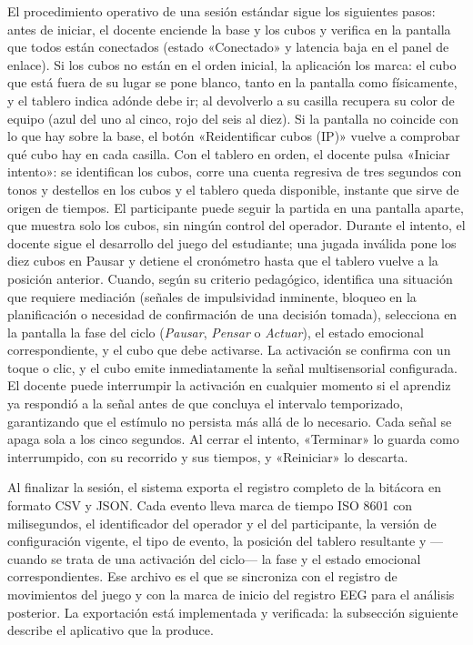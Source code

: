 \documentclass{book}
\begin{document}
El procedimiento operativo de una sesión estándar sigue los siguientes
pasos: antes de iniciar, el docente enciende la base y los cubos y
verifica en la pantalla que todos están conectados (estado «Conectado» y
latencia baja en el panel de enlace). Si los cubos no están en el orden
inicial, la aplicación los marca: el cubo que está fuera de su lugar se
pone blanco, tanto en la pantalla como físicamente, y el tablero indica
adónde debe ir; al devolverlo a su casilla recupera su color de equipo
(azul del uno al cinco, rojo del seis al diez). Si la pantalla no coincide
con lo que hay sobre la base, el botón «Reidentificar cubos (IP)» vuelve a
comprobar qué cubo hay en cada casilla. Con el tablero en orden, el
docente pulsa «Iniciar intento»: se identifican los cubos, corre una
cuenta regresiva de tres segundos con tonos y destellos en los cubos y el
tablero queda disponible, instante que sirve de origen de tiempos. El
participante puede seguir la partida en una pantalla aparte, que muestra
solo los cubos, sin ningún control del operador. Durante el intento, el
docente sigue el desarrollo del juego del estudiante; una jugada
inválida pone los diez cubos en Pausar y detiene el cronómetro hasta que
el tablero vuelve a la posición anterior. Cuando, según su criterio pedagógico,
identifica una situación que requiere mediación (señales de impulsividad
inminente, bloqueo en la planificación o necesidad de confirmación de una
decisión tomada), selecciona en la pantalla la fase del ciclo
(\textit{Pausar}, \textit{Pensar} o \textit{Actuar}), el estado
emocional correspondiente, y el cubo que debe activarse. La activación se
confirma con un toque o clic, y el cubo emite inmediatamente la señal
multisensorial configurada. El docente puede interrumpir la activación en
cualquier momento si el aprendiz ya respondió a la señal antes de que
concluya el intervalo temporizado, garantizando que el estímulo no
persista más allá de lo necesario. Cada señal se apaga sola a los cinco segundos. Al cerrar el intento, «Terminar» lo guarda como interrumpido, con su recorrido y sus tiempos, y «Reiniciar» lo descarta.
 
Al finalizar la sesión, el sistema exporta el registro completo de la
bitácora en formato CSV y JSON. Cada evento lleva marca de tiempo ISO 8601
con milisegundos, el identificador del operador y el del participante, la
versión de configuración vigente, el tipo de evento, la posición del
tablero resultante y —cuando se trata de una activación del ciclo— la fase
y el estado emocional correspondientes. Ese archivo es el que se
sincroniza con el registro de movimientos del juego y con la marca de
inicio del registro EEG para el análisis posterior. La exportación está
implementada y verificada: la subsección siguiente describe el aplicativo
que la produce.
 
\end{document}
